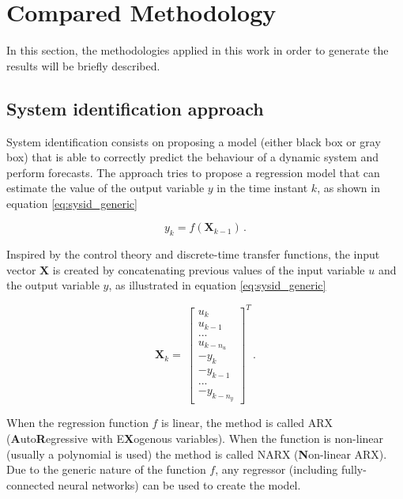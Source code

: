 \documentclass[conference]{IEEEtran}
\begin{document}
\section{Compared Methodology}\label{section_method}

In this section, the methodologies applied in this work in order to generate the results 
will be briefly described.

\subsection{System identification approach}

System identification consists on proposing a model (either black box or gray box) that is able
to correctly predict the behaviour of a dynamic system and perform forecasts. The approach tries 
to propose a regression model that can estimate the value of the output variable $y$ in the 
time instant $k$, as shown in equation \ref{eq:sysid_generic}

\begin{equation}\label{eq:sysid_generic}
    y_k = f(\mathbf{X}_{k-1})\,.
\end{equation}

Inspired by the control theory and discrete-time transfer functions, the input vector $\mathbf{X}$
is created by concatenating previous values of the input variable $u$ and the output variable $y$,
as illustrated in equation \ref{eq:sysid_generic}

\begin{equation}\label{eq:sysid_lags}
    \mathbf{X}_k = \
    \begin{bmatrix}
        u_{k} \\ u_{k-1} \\ ... \\ u_{k-n_u} \\ -y_{k} \\ -y_{k-1} \\ ... \\ -y_{k-n_y}
    \end{bmatrix}^T\,.
\end{equation}

When the regression function $f$ is linear, the method is called ARX (\textbf{A}uto\textbf{R}egressive
with E\textbf{X}ogenous variables). When the function is non-linear (usually a polynomial is used)
the method is called NARX (\textbf{N}on-linear ARX). Due to the generic nature of the function $f$,
any regressor (including fully-connected neural networks) can be used to create the model.
\end{document}
